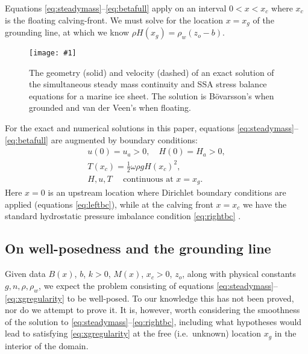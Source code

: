 \documentclass[twocolumn,letterpaper]{igs}
\renewcommand{\dh}{\fontencoding{T1}\selectfont{\symbol{240}}}
\newcommand{\onecol}[1]{\texttt{[image: \#1]}}
\newcommand{\bod}{B\"o\dh varsson\xspace}
\begin{document}
Equations \eqref{eq:steadymass}--\eqref{eq:betafull} apply on an interval $0 < x < x_c$ where $x_c$ is the floating calving-front.  We must solve for the location $x=x_g$ of the grounding line, at which we know $\rho H(x_g) = \rho_w (z_o - b)$.

\begin{figure}[ht]
\onecol{em-geometry}
\caption{The geometry (solid) and velocity (dashed) of an exact solution of the simultaneous steady mass continuity and SSA stress balance equations for a marine ice sheet.  The solution is \bod's when grounded and van der Veen's when floating.} \label{fig:exactmarine}
\end{figure}

For the exact and numerical solutions in this paper, equations \eqref{eq:steadymass}--\eqref{eq:betafull} are augmented by boundary conditions:
\begin{gather}
u(0) = u_a > 0, \quad H(0) = H_a > 0, \label{eq:leftbc} \\
T(x_c) = \frac{1}{2} \omega \rho g H(x_c)^2,  \label{eq:rightbc} \\
H, u, T \quad \text{ continuous at } x = x_g.  \label{eq:xgregularity}
\end{gather}
Here $x=0$ is an upstream location where Dirichlet boundary conditions are applied (equations \eqref{eq:leftbc}), while at the calving front $x=x_c$ we have the standard hydrostatic pressure imbalance condition \eqref{eq:rightbc} \citep{SchoofMarine1}.

\subsection*{On well-posedness and the grounding line}  Given data $B(x)$, $b$, $k>0$, $M(x)$, $x_c>0$, $z_o$, along with physical constants $g,n,\rho,\rho_w$, we expect the problem consisting of equations \eqref{eq:steadymass}--\eqref{eq:xgregularity} to be well-posed.  To our knowledge this has not been proved, nor do we attempt to prove it.  It is, however, worth considering the smoothness of the solution to \eqref{eq:steadymass}--\eqref{eq:rightbc}, including what hypotheses would lead to satisfying \eqref{eq:xgregularity} at the free (i.e.~unknown) location $x_g$ in the interior of the domain.
\end{document}
